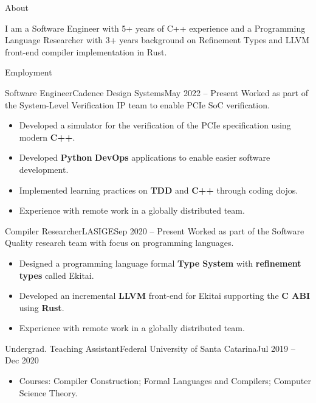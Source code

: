 \documentclass[calibri]{mcdowellcv}
\begin{document}
	\makeheader{}

	\begin{cvsection}{About}
		\begin{cvsubsection}{}{}{}
		I am a Software Engineer with 5+ years of C++ experience and a Programming Language Researcher with 3+ years background on Refinement Types and LLVM front-end compiler implementation in Rust.
		\end{cvsubsection}
	\end{cvsection}

	\begin{cvsection}{Employment}
		\begin{cvsubsection}{Software Engineer}{Cadence Design Systems}{May 2022 -- Present}
			Worked as part of the System-Level Verification IP team to enable PCIe SoC verification.
			\begin{itemize}
				\item Developed a simulator for the verification of the PCIe specification using modern \textbf{C++}.
				\item Developed \textbf{Python} \textbf{DevOps} applications to enable easier software development.
				\item Implemented learning practices on \textbf{TDD} and \textbf{C++} through coding dojos.
				\item Experience with remote work in a globally distributed team.
			\end{itemize}
		\end{cvsubsection}

		\begin{cvsubsection}{Compiler Researcher}{LASIGE}{Sep 2020 -- Present}
			Worked as part of the Software Quality research team with focus on programming languages.
			\begin{itemize}
				\item Designed a programming language formal \textbf{Type System} with \textbf{refinement types} called Ekitai.
				\item Developed an incremental \textbf{LLVM} front-end for Ekitai supporting the \textbf{C ABI} using \textbf{Rust}.
				\item Experience with remote work in a globally distributed team.
			\end{itemize}
		\end{cvsubsection}

		\begin{cvsubsection}{Undergrad. Teaching Assistant}{Federal University of Santa Catarina}{Jul 2019 -- Dec 2020}
			\begin{itemize}
				\item Courses: Compiler Construction; Formal Languages and Compilers; Computer Science Theory.
			\end{itemize}
		\end{cvsubsection}


\end{cvsection}
\end{document}
